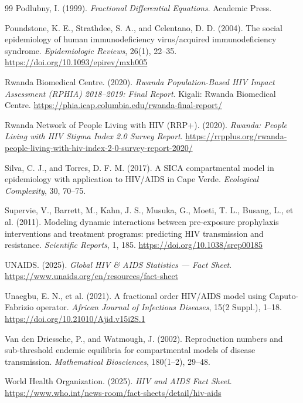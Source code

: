 \documentclass[12pt,a4paper,oneside]{report}
\begin{document}
\begin{thebibliography}{99}
Podlubny, I. (1999).
\textit{Fractional Differential Equations}.
Academic Press.

Poundstone, K. E., Strathdee, S. A., and Celentano, D. D. (2004).
The social epidemiology of human immunodeficiency virus/acquired immunodeficiency syndrome.
\textit{Epidemiologic Reviews}, 26(1), 22--35.
\url{https://doi.org/10.1093/epirev/mxh005}

Rwanda Biomedical Centre. (2020).
\textit{Rwanda Population-Based HIV Impact Assessment (RPHIA) 2018--2019: Final Report}.
Kigali: Rwanda Biomedical Centre.
\url{https://phia.icap.columbia.edu/rwanda-final-report/}

Rwanda Network of People Living with HIV (RRP+). (2020).
\textit{Rwanda: People Living with HIV Stigma Index 2.0 Survey Report}.
\url{https://rrpplus.org/rwanda-people-living-with-hiv-index-2-0-survey-report-2020/}

Silva, C. J., and Torres, D. F. M. (2017).
A SICA compartmental model in epidemiology with application to HIV/AIDS in Cape Verde.
\textit{Ecological Complexity}, 30, 70--75.

Supervie, V., Barrett, M., Kahn, J. S., Musuka, G., Moeti, T. L., Busang, L., et al. (2011).
Modeling dynamic interactions between pre-exposure prophylaxis interventions and treatment programs: predicting HIV transmission and resistance.
\textit{Scientific Reports}, 1, 185.
\url{https://doi.org/10.1038/srep00185}

UNAIDS. (2025).
\textit{Global HIV \& AIDS Statistics --- Fact Sheet}.
\url{https://www.unaids.org/en/resources/fact-sheet}

Unaegbu, E. N., et al. (2021).
A fractional order HIV/AIDS model using Caputo-Fabrizio operator.
\textit{African Journal of Infectious Diseases}, 15(2 Suppl.), 1--18.
\url{https://doi.org/10.21010/Ajid.v15i2S.1}

Van den Driessche, P., and Watmough, J. (2002).
Reproduction numbers and sub-threshold endemic equilibria for compartmental models of disease transmission.
\textit{Mathematical Biosciences}, 180(1--2), 29--48.

World Health Organization. (2025).
\textit{HIV and AIDS Fact Sheet}.
\url{https://www.who.int/news-room/fact-sheets/detail/hiv-aids}

\end{thebibliography}
\end{document}
